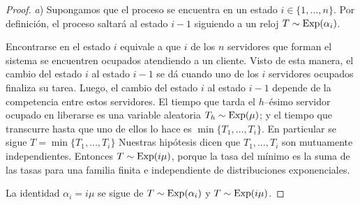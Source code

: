 \documentclass{article}
\DeclareMathOperator{\Exponential}{\textnormal{Exp}}
\theoremstyle{definition}
\begin{document}
\begin{proof} \textit{a})
Supongamos que el proceso se encuentra en un estado \(i \in \{1, \dots, n\}\).
Por definición, el proceso saltará al estado \(i - 1\) siguiendo a un reloj \(T \sim \Exponential(\alpha_i)\).

Encontrarse en el estado \(i\) equivale a que \(i\) de los \(n\) servidores que forman el sistema se encuentren ocupados atendiendo a un cliente.
Visto de esta manera, el cambio del estado \(i\) al estado \(i - 1\) se dá cuando uno de los \(i\) servidores ocupados finaliza su tarea.
Luego, el cambio del estado \(i\) al estado \(i - 1\) depende de la competencia entre estos servidores.
El tiempo que tarda el \(h\)--ésimo servidor ocupado en liberarse es una variable aleatoria \(T_h \sim \Exponential(\mu)\);
y el tiempo que transcurre hasta que uno de ellos lo hace es \(\min \{T_1, \dots, T_i\}\).
En particular se sigue \(T = \min \{T_1, \dots, T_i\}\)
Nuestras hipótesis dicen que \(T_1, \dots, T_i\) son mutuamente independientes.
Entonces \(T \sim \Exponential(i \mu)\), porque la tasa del mínimo es la suma de las tasas para una familia finita e independiente de distribuciones exponenciales.

La identidad \(\alpha_i  = i \mu\) se sigue de \(T \sim \Exponential(\alpha_i)\) y \(T \sim \Exponential(i \mu)\).
\end{proof}
\end{document}
